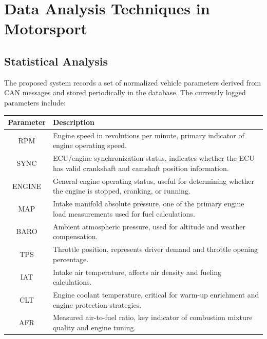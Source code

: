 \section{Data Analysis Techniques in Motorsport}
\subsection{Statistical Analysis}

The proposed system records a set of normalized vehicle parameters derived from CAN messages and stored periodically in the database. The currently logged parameters include:

\vspace{-0.2cm}
\begin{table}[H]
\centering
\begin{tabular}{|c|p{12cm}|}
\hline
\textbf{Parameter} & \textbf{Description} \\
\hline

RPM & Engine speed in revolutions per minute, primary indicator of engine operating speed.\\
\hline

SYNC & ECU/engine synchronization status, indicates whether the ECU has valid crankshaft and camshaft position information. \\
\hline

ENGINE & General engine operating status, useful for determining whether the engine is stopped, cranking, or running. \\
\hline

MAP & Intake manifold absolute pressure, one of the primary engine load measurements used for fuel calculations. \\
\hline

BARO & Ambient atmospheric pressure, used for altitude and weather compensation. \\
\hline

TPS & Throttle position, represents driver demand and throttle opening percentage. \\
\hline

IAT & Intake air temperature, affects air density and fueling calculations. \\
\hline

CLT & Engine coolant temperature, critical for warm-up enrichment and engine protection strategies. \\
\hline

AFR & Measured air-to-fuel ratio, key indicator of combustion mixture quality and engine tuning. \\
\hline


\end{tabular}
\end{table}
